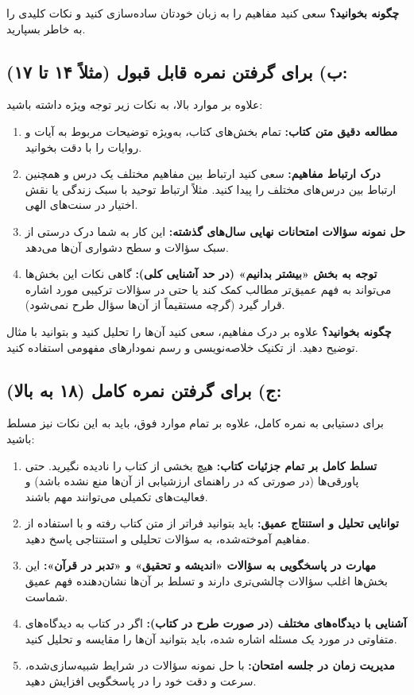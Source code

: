 \documentclass[11pt,a4paper]{article}
\begin{document}
\textbf{چگونه بخوانید؟} سعی کنید مفاهیم را به زبان خودتان ساده‌سازی کنید و نکات کلیدی را به خاطر بسپارید.

\subsection*{ب) برای گرفتن نمره قابل قبول (مثلاً ۱۴ تا ۱۷):}

علاوه بر موارد بالا، به نکات زیر توجه ویژه داشته باشید:

\begin{enumerate}
    \item \textbf{مطالعه دقیق متن کتاب:} تمام بخش‌های کتاب، به‌ویژه توضیحات مربوط به آیات و روایات را با دقت بخوانید.
    \item \textbf{درک ارتباط مفاهیم:} سعی کنید ارتباط بین مفاهیم مختلف یک درس و همچنین ارتباط بین درس‌های مختلف را پیدا کنید. مثلاً ارتباط توحید با سبک زندگی یا نقش اختیار در سنت‌های الهی.
    \item \textbf{حل نمونه سؤالات امتحانات نهایی سال‌های گذشته:} این کار به شما درک درستی از سبک سؤالات و سطح دشواری آن‌ها می‌دهد.
    \item \textbf{توجه به بخش «بیشتر بدانیم» (در حد آشنایی کلی):} گاهی نکات این بخش‌ها می‌تواند به فهم عمیق‌تر مطالب کمک کند یا حتی در سؤالات ترکیبی مورد اشاره قرار گیرد (گرچه مستقیماً از آن‌ها سؤال طرح نمی‌شود).
\end{enumerate}

\textbf{چگونه بخوانید؟} علاوه بر درک مفاهیم، سعی کنید آن‌ها را تحلیل کنید و بتوانید با مثال توضیح دهید. از تکنیک خلاصه‌نویسی و رسم نمودارهای مفهومی استفاده کنید.

\subsection*{ج) برای گرفتن نمره کامل (۱۸ به بالا):}

برای دستیابی به نمره کامل، علاوه بر تمام موارد فوق، باید به این نکات نیز مسلط باشید:

\begin{enumerate}
    \item \textbf{تسلط کامل بر تمام جزئیات کتاب:} هیچ بخشی از کتاب را نادیده نگیرید. حتی پاورقی‌ها (در صورتی که در راهنمای ارزشیابی از آن‌ها منع نشده باشد) و فعالیت‌های تکمیلی می‌توانند مهم باشند.
    \item \textbf{توانایی تحلیل و استنتاج عمیق:} باید بتوانید فراتر از متن کتاب رفته و با استفاده از مفاهیم آموخته‌شده، به سؤالات تحلیلی و استنتاجی پاسخ دهید.
    \item \textbf{مهارت در پاسخگویی به سؤالات «اندیشه و تحقیق» و «تدبر در قرآن»:} این بخش‌ها اغلب سؤالات چالشی‌تری دارند و تسلط بر آن‌ها نشان‌دهنده فهم عمیق شماست.
    \item \textbf{آشنایی با دیدگاه‌های مختلف (در صورت طرح در کتاب):} اگر در کتاب به دیدگاه‌های متفاوتی در مورد یک مسئله اشاره شده، باید بتوانید آن‌ها را مقایسه و تحلیل کنید.
    \item \textbf{مدیریت زمان در جلسه امتحان:} با حل نمونه سؤالات در شرایط شبیه‌سازی‌شده، سرعت و دقت خود را در پاسخگویی افزایش دهید.
\end{enumerate}
\end{document}
